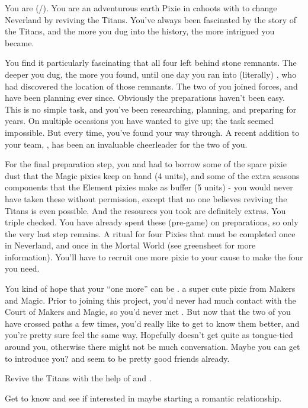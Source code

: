 \documentclass[char]{PP}
\begin{document}
\name{\cETitan{}}

You are \cETitan{} (\cETitan{\They}/\cETitan{\Them}). You are an adventurous earth Pixie in cahoots with \cFTitan{} to change Neverland by reviving the Titans. You’ve always been fascinated by the story of the Titans, and the more you dug into the history, the more intrigued you became. 

You find it particularly fascinating that all four left behind stone remnants. The deeper you dug, the more you found, until one day you ran into (literally) \cFTitan{}, who had discovered the location of those remnants. The two of you joined forces, and have been planning ever since. Obviously the preparations haven’t been easy. This is no simple task, and you’ve been researching, planning, and preparing for years. On multiple occasions you have wanted to give up; the task seemed impossible. But every time, you’ve found your way through. A recent addition to your team, \cEAirship{}, has been an invaluable cheerleader for the two of you.

For the final preparation step, you and \cETitan{} had to borrow some of the spare pixie dust that the Magic pixies keep on hand (4 units), and some of the extra seasons components that the Element pixies make as buffer (5 units) - you would never have taken these without permission, except that no one believes reviving the Titans is even possible. And the resources you took are definitely extras. You triple checked. You have already spent these (pre-game) on preparations, so only the very last step remains. A ritual for four Pixies that must be completed once in Neverland, and once in the Mortal World (see greensheet for more information). You’ll have to recruit one more pixie to your cause to make the four you need.

You kind of hope that your “one more” can be \cMAirship{}. \cMAirship{\Theyare} a super cute pixie from Makers and Magic. Prior to \cEAirship{} joining this project, you’d never had much contact with the Court of Makers and Magic, so you’d never met \cMAirship{}. But now that the two of you have crossed paths a few times, you’d really like to get to know them better, and you’re pretty sure \cMAirship{\they} feel\cMAirship{\verbs} the same way. Hopefully \cMAirship{} doesn’t get quite as tongue-tied around you, otherwise there might not be much conversation. Maybe you can get \cEAirship{} to introduce you? \cEAirship{} and \cMAirship{} seem to be pretty good friends already.
 

\begin{itemz}
	\item Revive the Titans with the help of \cFTitan{} and \cEAirship{}.
	\item Get to know \cMAirship{} and see if \cMAirship{\theyare} interested in maybe starting a romantic relationship.
\end{itemz}
\end{document}
